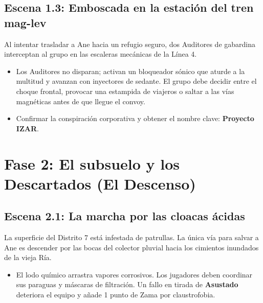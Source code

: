 \subsection{Escena 1.3: Emboscada en la estación del tren mag-lev}
Al intentar trasladar a Ane hacia un refugio seguro, dos Auditores de gabardina interceptan al grupo en las escaleras mecánicas de la Línea 4.
\begin{itemize}
  \item {} Los Auditores no disparan; activan un bloqueador sónico que aturde a la multitud y avanzan con inyectores de sedante. El grupo debe decidir entre el choque frontal, provocar una estampida de viajeros o saltar a las vías magnéticas antes de que llegue el convoy.
  \item {} Confirmar la conspiración corporativa y obtener el nombre clave: \textbf{Proyecto IZAR}.
\end{itemize}

\section{Fase 2: El subsuelo y los Descartados (El Descenso)}


\subsection{Escena 2.1: La marcha por las cloacas ácidas}
La superficie del Distrito 7 está infestada de patrullas. La única vía para salvar a Ane es descender por las bocas del colector pluvial hacia los cimientos inundados de la vieja Ría.
\begin{itemize}
  \item {} El lodo químico arrastra vapores corrosivos. Los jugadores deben coordinar sus paraguas y máscaras de filtración. Un fallo en tirada de \textbf{Asustado} deteriora el equipo y añade 1 punto de Zama por claustrofobia.
\end{itemize}

